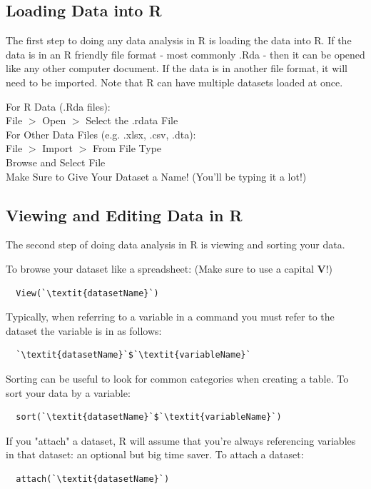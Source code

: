 \documentclass[12pt,letterpaper]{article}
\newcommand{\ind}{\phantom{AA}}
\begin{document}
\subsection{Loading Data into R}
\normalsize The first step to doing any data analysis in R is loading the data into R. If the data is in an R friendly file format - most commonly .Rda - then it can be opened like any other computer document. If the data is in another file format, it will need to be imported.
Note that R can have multiple datasets loaded at once.

\vspace{.5em}

\begin{tcolorbox}[title = Loading Datasets]
  For R Data (.Rda files): \\
\ind File $>$ Open $>$ Select the .rdata File \vspace{1em}\\
  For Other Data Files (e.g. .xlsx, .csv, .dta):\\
\ind  File $>$ Import $>$ From File Type \\
\ind  Browse and Select File \\
\ind  Make Sure to Give Your Dataset a Name! (You'll be typing it a lot!) 
\end{tcolorbox}

\subsection{Viewing and Editing Data in R}
The second step of doing data analysis in R is viewing and sorting your data.

\vspace{.5em}

\begin{tcolorbox}[title = Basic Data Viewing and Editing]
To browse your dataset like a spreadsheet: (Make sure to use a capital \textbf{V}!)
\begin{lstlisting}
  View(`\textit{datasetName}`)
\end{lstlisting}
\end{tcolorbox}


\begin{tcolorbox}[title = Basic Data Viewing and Editing (cont.)]
Typically, when referring to a variable in a command you must refer to the dataset the variable is in as follows:
\begin{lstlisting}
  `\textit{datasetName}`$`\textit{variableName}`
\end{lstlisting}
Sorting can be useful to look for common categories when creating a table. To sort your data by a variable: 
\begin{lstlisting}
  sort(`\textit{datasetName}`$`\textit{variableName}`)
\end{lstlisting}
If you "attach" a dataset, R will assume that you're always referencing variables in that dataset: an optional but big time saver. To attach a dataset:
\begin{lstlisting}
  attach(`\textit{datasetName}`)
\end{lstlisting}
\end{tcolorbox}
\end{document}
